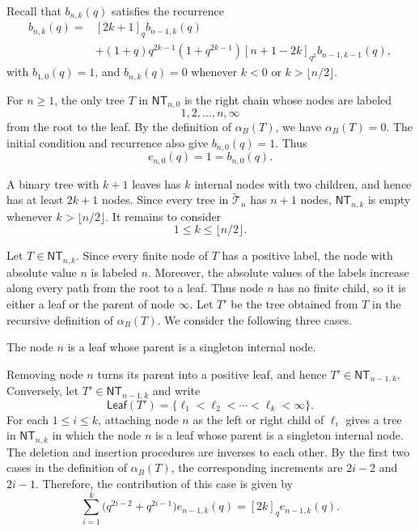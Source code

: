 \documentclass[12pt]{article}
\numberwithin{equation}{section}
\theoremstyle{plain}
\def\Leaf{\mathsf{Leaf}}
\def\NT{\mathsf{NT}}
\begin{document}
	 				 	
	 				 	
	 				 	 
	 				 	
	 				 	Recall that $b_{n,k}(q)$ satisfies the recurrence
	 				 	\[
	 				 	\begin{aligned}
	 				 		b_{n,k}(q)={}&[2k+1]_q b_{n-1,k}(q)\\
	 				 		&+(1+q)q^{2k-1}(1+q^{2k-1})
	 				 		[n+1-2k]_{q^2}b_{n-1,k-1}(q),
	 				 	\end{aligned}
	 				 	\]
	 				 	with $b_{1,0}(q)=1$, and $b_{n,k}(q)=0$ whenever
	 				 	$k<0$ or $k>\lfloor n/2\rfloor$.
	 				 	
	 				 	For $n\geq 1$, the only tree $T$ in $\NT_{n,0}$ is the right chain
	 				 	whose nodes are labeled
	 				 	\[
	 				 	1,2,\ldots,n,\infty
	 				 	\]
	 				 	from the root to the leaf. By the definition of $\alpha_B(T)$,  we have $\alpha_B(T)=0$. The initial condition and recurrence also give
	 				 	$b_{n,0}(q)=1$. Thus
	 				 	\[
	 				 	e_{n,0}(q)=1=b_{n,0}(q).
	 				 	\]
	 				 	
	 				 	A binary tree with $k+1$ leaves has $k$ internal nodes with two
	 				 	children, and hence has at least $2k+1$ nodes. Since every tree in
	 				 	$\widetilde{\mathcal T}_n$ has $n+1$ nodes, $\mathsf{NT}_{n,k}$ is
	 				 	empty whenever $k>\lfloor n/2\rfloor$. It remains to consider
	 				 	\[
	 				 	1\leq k\leq\lfloor n/2\rfloor.
	 				 	\]
	 				 	
	 				 	Let $T\in\mathsf{NT}_{n,k}$. Since every finite node of $T$ has a
	 				 	positive label, the node with absolute value $n$ is labeled $n$.
	 				 	Moreover, the absolute values of the labels increase along every path
	 				 	from the root to a leaf. Thus node $n$ has no finite child, so it is
	 				 	either a leaf or the parent of node $\infty$. Let $T'$ be the tree
	 				 	obtained from $T$ in the recursive definition of $\alpha_B(T)$. We
	 				 	consider the following three cases.
	 				 	
	 				 	\medskip
	 				 	 The node $n$ is a leaf whose parent is a
	 				 	singleton internal node.
	 				 	
	 				 	Removing node $n$ turns its parent into a positive leaf, and hence
	 				 	$T'\in\mathsf{NT}_{n-1,k}$. Conversely, let
	 				 	$T'\in\mathsf{NT}_{n-1,k}$ and write
	 				 	\[
	 				 	\Leaf(T')=\{\ell_1<\ell_2<\cdots<\ell_k<\infty\}.
	 				 	\]
	 				 	For each $1\leq i\leq k$, attaching node $n$ as the left or right
	 				 	child of $\ell_i$ gives a tree in $\mathsf{NT}_{n,k}$ in which the node $n$ is a leaf whose parent is a
	 				 	singleton internal node.  The deletion and insertion procedures are inverses to each
	 				 	other. By the first two cases in the definition of $\alpha_B(T)$, the
	 				 	corresponding increments are $2i-2$ and $2i-1$. Therefore, the
	 				 	contribution of this case is given by
	 				 	\[
	 				 	\sum_{i=1}^{k}\bigl(q^{2i-2}+q^{2i-1}\bigr)e_{n-1,k}(q)
	 				 	=[2k]_q e_{n-1,k}(q).
	 				 	\]
	 				 	
\end{document}
